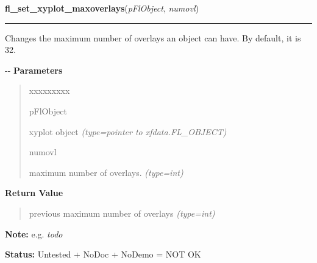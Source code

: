     \label{xformslib:flxyplot:fl_set_xyplot_maxoverlays}

    \vspace{0.5ex}

\hspace{.8\funcindent}\begin{boxedminipage}{\funcwidth}

    \raggedright \textbf{fl\_set\_xyplot\_maxoverlays}(\textit{pFlObject}, \textit{numovl})

    \vspace{-1.5ex}

    \rule{\textwidth}{0.5\fboxrule}
\setlength{\parskip}{2ex}

Changes the maximum number of overlays an object can have. By default,
it is 32.

-{}-
\setlength{\parskip}{1ex}
      \textbf{Parameters}
      \vspace{-1ex}

      \begin{quote}
        \begin{Ventry}{xxxxxxxxx}

          \item[pFlObject]


xyplot object
            {\it (type=pointer to xfdata.FL\_OBJECT)}

          \item[numovl]


maximum number of overlays.
            {\it (type=int)}

        \end{Ventry}

      \end{quote}

      \textbf{Return Value}
    \vspace{-1ex}

      \begin{quote}

previous maximum number of overlays
      {\it (type=int)}

      \end{quote}

\textbf{Note:} 
e.g. \emph{todo}


\textbf{Status:} 
Untested + NoDoc + NoDemo = NOT OK


    \end{boxedminipage}

